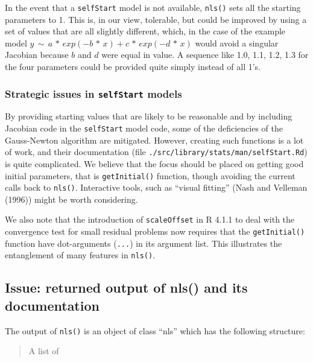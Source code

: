 In the event that a \texttt{selfStart} model is not available, \texttt{nls()} sets all the
starting parameters to 1. This is, in our view, tolerable, but could be improved
by using a set of values that are all slightly different, which, in the case of
the example model \(y \,\sim\, a \,*\, exp(-b \,*\, x) + c\,*\,exp(-d \,*\, x)\)
would avoid a singular Jacobian because \(b\) and \(d\) were equal in value.
A sequence like 1.0, 1.1, 1.2, 1.3 for the four parameters
could be provided quite simply instead of all 1's.

\hypertarget{strategic-issues-in-selfstart-models}{%
\subsubsection{\texorpdfstring{Strategic issues in \texttt{selfStart} models}{Strategic issues in selfStart models}}\label{strategic-issues-in-selfstart-models}}

By providing starting values that are likely to be reasonable and by including
Jacobian code in the \texttt{selfStart} model code, some of the deficiencies of the
Gauss-Newton algorithm are mitigated. However, creating such functions is a lot
of work, and their
documentation (file \texttt{./src/library/stats/man/selfStart.Rd}) is quite complicated.
We believe that the focus should be placed on getting good initial parameters,
that is \texttt{getInitial()} function, though avoiding the current calls back to \texttt{nls()}.
Interactive tools, such as ``visual fitting'' (Nash and Velleman (1996)) might be
worth considering.

We also note that the introduction of \texttt{scaleOffset} in R 4.1.1 to deal with the
convergence test for small residual problems now requires that the \texttt{getInitial()}
function have dot-arguments (\texttt{...}) in its argument list. This illustrates the
entanglement of many features in \texttt{nls()}.

\hypertarget{issue-returned-output-of-nls-and-its-documentation}{%
\subsection{Issue: returned output of nls() and its documentation}\label{issue-returned-output-of-nls-and-its-documentation}}

The output of \texttt{nls()} is an object of class ``nls'' which has the following structure:

\begin{quote}
A list of
\end{quote}

